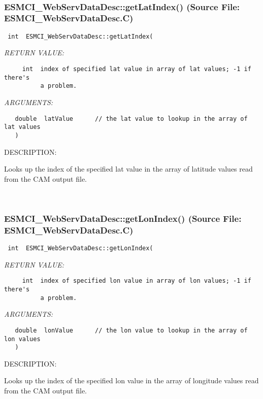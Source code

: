 \mbox{}\hrulefill\
 
\subsubsection{ESMCI\_WebServDataDesc::getLatIndex() (Source File: ESMCI\_WebServDataDesc.C)}


  
\begin{verbatim} int  ESMCI_WebServDataDesc::getLatIndex(\end{verbatim}{\em RETURN VALUE:}
\begin{verbatim}     int  index of specified lat value in array of lat values; -1 if there's
          a problem.\end{verbatim}{\em ARGUMENTS:}
\begin{verbatim}   double  latValue      // the lat value to lookup in the array of lat values
   )\end{verbatim}
{\sf DESCRIPTION:\\ }


      Looks up the index of the specified lat value in the array of latitude
      values read from the CAM output file.
   
 
\mbox{}\hrulefill\
 
\subsubsection{ESMCI\_WebServDataDesc::getLonIndex() (Source File: ESMCI\_WebServDataDesc.C)}


  
\begin{verbatim} int  ESMCI_WebServDataDesc::getLonIndex(\end{verbatim}{\em RETURN VALUE:}
\begin{verbatim}     int  index of specified lon value in array of lon values; -1 if there's
          a problem.\end{verbatim}{\em ARGUMENTS:}
\begin{verbatim}   double  lonValue      // the lon value to lookup in the array of lon values
   )\end{verbatim}
{\sf DESCRIPTION:\\ }


      Looks up the index of the specified lon value in the array of longitude
      values read from the CAM output file.
   

